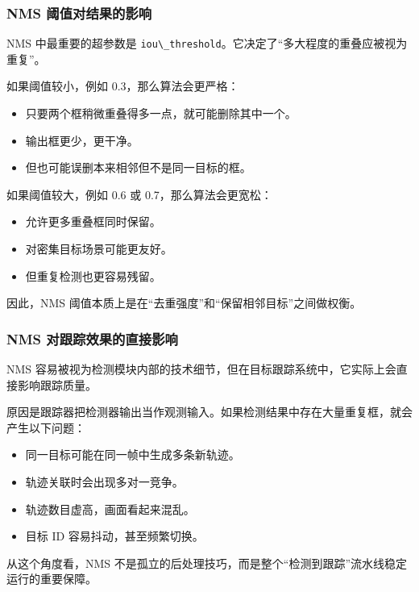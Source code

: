 \subsubsection{NMS 阈值对结果的影响}\label{src-experiment-case2-h35}

NMS 中最重要的超参数是
\passthrough{\lstinline!iou\_threshold!}。它决定了``多大程度的重叠应被视为重复''。

如果阈值较小，例如 0.3，那么算法会更严格：

\begin{itemize}
\tightlist
\item
  只要两个框稍微重叠得多一点，就可能删除其中一个。
\item
  输出框更少，更干净。
\item
  但也可能误删本来相邻但不是同一目标的框。
\end{itemize}

如果阈值较大，例如 0.6 或 0.7，那么算法会更宽松：

\begin{itemize}
\tightlist
\item
  允许更多重叠框同时保留。
\item
  对密集目标场景可能更友好。
\item
  但重复检测也更容易残留。
\end{itemize}

因此，NMS 阈值本质上是在``去重强度''和``保留相邻目标''之间做权衡。

\subsubsection{NMS 对跟踪效果的直接影响}\label{src-experiment-case2-h36}

NMS
容易被视为检测模块内部的技术细节，但在目标跟踪系统中，它实际上会直接影响跟踪质量。

原因是跟踪器把检测器输出当作观测输入。如果检测结果中存在大量重复框，就会产生以下问题：

\begin{itemize}
\tightlist
\item
  同一目标可能在同一帧中生成多条新轨迹。
\item
  轨迹关联时会出现多对一竞争。
\item
  轨迹数目虚高，画面看起来混乱。
\item
  目标 ID 容易抖动，甚至频繁切换。
\end{itemize}

从这个角度看，NMS
不是孤立的后处理技巧，而是整个``检测到跟踪''流水线稳定运行的重要保障。

